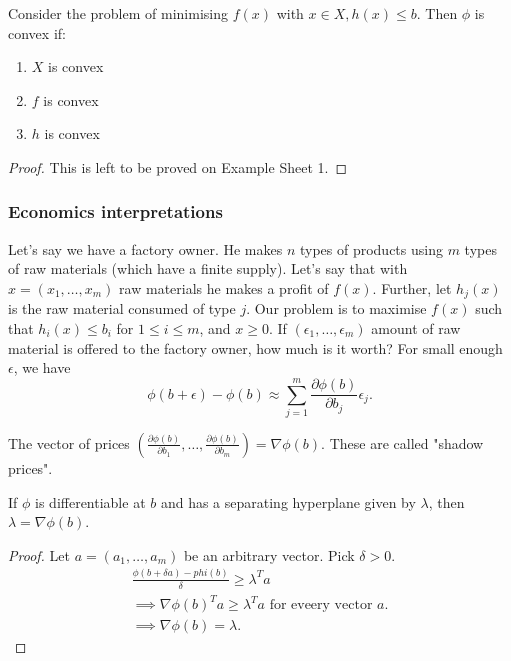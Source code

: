 \documentclass[a4paper]{scrartcl}
\begin{document}
\begin{theorem}
	 Consider the problem of minimising $f (x)$ with $x \in X, h (x)\leq b$. Then $\phi$ is convex if: 
	 \begin{enumerate}
		 \item $X$ is convex
		 \item $f$ is convex
		 \item $h$ is convex
	 \end{enumerate}
\end{theorem}
\begin{proof}
	 This is left to be proved on Example Sheet 1.
\end{proof}
\subsubsection{Economics interpretations}
Let's say we have a factory owner. He makes $n$ types of products using $m$ types of raw materials (which have a finite supply). Let's say that with $x=(x_1,\ldots ,x_m)$ raw materials he makes a profit of $f (x)$.\newline 
Further, let $h_j (x)$ is the raw material consumed of type $j$. Our problem is to maximise $f (x)$ such that $h_i (x) \leq b_i$ for $1 \leq i \leq m$, and $x \geq 0.$\newline 
If $(\epsilon_1,\ldots , \epsilon_m)$ amount of raw material is offered to the factory owner, how much is it worth? For small enough $\epsilon $, we have 
\[\phi (b+\epsilon )-\phi (b)\approx \sum_{j=1}^{m}\frac{\partial \phi (b)}{\partial b_j} \epsilon_j.\]

The vector of prices $(\frac{\partial \phi (b)}{\partial b_1} ,\ldots , \frac{\partial \phi (b)}{\partial b_m} )=\nabla \phi (b)$. These are called "shadow prices".

\begin{theorem}
	 If $\phi$ is differentiable at $b$ and has a separating hyperplane given by $\lambda$, then $\lambda=\nabla \phi (b)$.
\end{theorem}
\begin{proof}
	 Let $a= (a_1,\ldots , a_m)$ be an arbitrary vector. Pick $\delta>0$.
	 \begin{equation*}
		  \begin{split}
			  \frac{\phi (b+\delta a)- phi (b)}{\delta}\geq \lambda^T a\\
			  \implies \nabla \phi (b)^T a \geq \lambda^T a \text{ for eveery vector } a.\\
			  \implies \nabla \phi (b)=\lambda.
		  \end{split}
	 \end{equation*} 
\end{proof}
\end{document}
